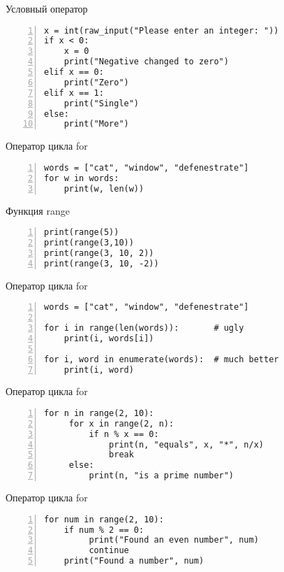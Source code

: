 \documentclass[hyperref={pdftex,unicode}]{beamer}
\begin{document}
\begin{frame}[fragile]{Условный оператор}
  \begin{lstlisting}[numbers=left]
x = int(raw_input("Please enter an integer: "))
if x < 0:
    x = 0
    print("Negative changed to zero")
elif x == 0:
    print("Zero")
elif x == 1:
    print("Single")
else:
    print("More")
  \end{lstlisting}
\end{frame}

\begin{frame}[fragile]{Оператор цикла for}
  \begin{lstlisting}[numbers=left]
words = ["cat", "window", "defenestrate"]
for w in words:
    print(w, len(w))
\end{lstlisting}
\end{frame}

\begin{frame}[fragile]{Функция range}
  \begin{lstlisting}[numbers=left]
print(range(5))
print(range(3,10))
print(range(3, 10, 2))
print(range(3, 10, -2))
\end{lstlisting}
\end{frame}


\begin{frame}[fragile]{Оператор цикла for}
  \begin{lstlisting}[numbers=left]
words = ["cat", "window", "defenestrate"]

for i in range(len(words)):       # ugly
    print(i, words[i])

for i, word in enumerate(words):  # much better
    print(i, word)
\end{lstlisting}
\end{frame}


\begin{frame}[fragile]{Оператор цикла for}
  \begin{lstlisting}[numbers=left]
for n in range(2, 10):
     for x in range(2, n):
         if n % x == 0:
             print(n, "equals", x, "*", n/x)
             break
     else:
         print(n, "is a prime number")
  \end{lstlisting}
\end{frame}

\begin{frame}[fragile]{Оператор цикла for}
  \begin{lstlisting}[numbers=left]
for num in range(2, 10):
    if num % 2 == 0:
         print("Found an even number", num)
         continue
    print("Found a number", num)
  \end{lstlisting}
\end{frame}
\end{document}

